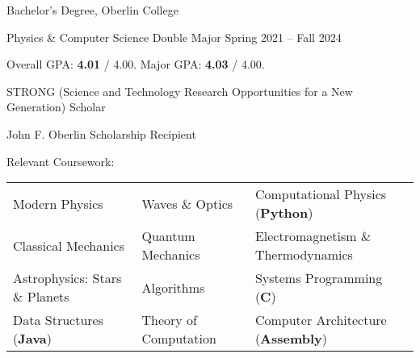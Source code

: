 \begin{entry}{Bachelor's Degree, Oberlin College}

	\entryItem
		{Physics \& Computer Science Double Major}
		{Spring 2021 -- Fall 2024}

	\begin{items}
		\item Overall GPA: \textbf{4.01} / 4.00. Major GPA: \textbf{4.03} / 4.00.
		
		\item STRONG (Science and Technology Research Opportunities for a New Generation) Scholar

		\item John F. Oberlin Scholarship Recipient
		
		\item Relevant Coursework:
		
			\begin{tabular}{lll}
				Modern Physics & Waves \& Optics & Computational Physics (\textbf{Python}) \\
				Classical Mechanics & Quantum Mechanics & Electromagnetism \& Thermodynamics \\
				Astrophysics: Stars \& Planets & Algorithms & Systems Programming (\textbf{C}) \\
				Data Structures (\textbf{Java}) & Theory of Computation & Computer Architecture (\textbf{Assembly}) \\
			\end{tabular}
	\end{items}

\end{entry}
